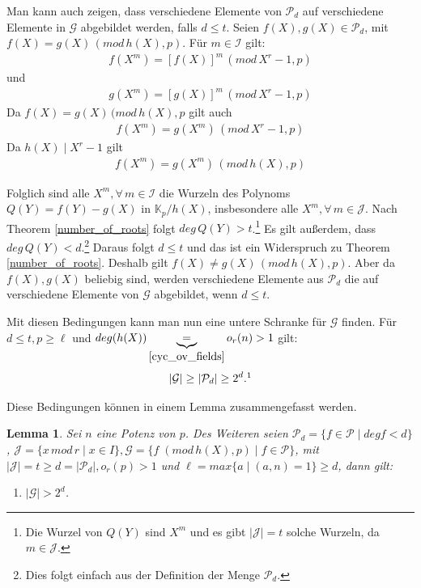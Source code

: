 \documentclass[12pt,oneside]{article}
\newtheorem{lemma}[theorem]{Lemma}
\theoremstyle{remark}
\theoremstyle{definition}
\begin{document}
\begin{flushleft}
Man kann auch zeigen, dass verschiedene Elemente von $\mathcal{P}_d$ auf verschiedene Elemente in $\mathcal{G}$ abgebildet werden, falls $d \leq t$. Seien $f(X),g(X) \in \mathcal{P}_{d}$, mit $f(X) = g(X) \, (mod \, h(X),p)$. Für $m \in \mathcal{I}$ gilt:
\begin{align*}
    f(X^m) = [f(X)]^{m} \, (mod \,X^{r} - 1,p)
\end{align*}
und
\begin{align*}
    g(X^m) = [g(X)]^{m} \, (mod \, X^{r} - 1,p)
\end{align*}
Da $f(X) = g(X) \, (mod \, h(X),p$ gilt auch
\begin{align*}
    f(X^m) = g(X^m) \, (mod \, X^{r} - 1,p)
\end{align*}
Da $h(X) \mid X^{r} - 1$ gilt
\begin{align*}
    f(X^m) = g(X^m) \, (mod \, h(X),p)
\end{align*}

Folglich sind alle $X^m, \forall \, m \in \mathcal{I}$ die Wurzeln des Polynoms $Q(Y) = f(Y) - g(X)$ in $\mathbb{K}_p/h(X)$, insbesondere alle $X^m, \forall \, m \in \mathcal{J}$. Nach Theorem \ref{number_of_roots} folgt $deg \, Q(Y) > t$.\footnote{Die Wurzel von $Q(Y)$ sind $X^m$ und es gibt $|\mathcal{J}| = t$ solche Wurzeln, da $m \in \mathcal{J}$.} Es gilt außerdem, dass $deg \, Q(Y) < d$.\footnote{Dies folgt einfach aus der Definition der Menge $\mathcal{P}_d$.} Daraus folgt $d \leq t$ und das ist ein Widerspruch zu Theorem \ref{number_of_roots}. Deshalb gilt $f(X) \neq g(X) \, (mod \, h(X),p)$. Aber da $f(X),g(X)$ beliebig sind, werden verschiedene Elemente aus $\mathcal{P}_d$ die auf verschiedene Elemente von $\mathcal{G}$ abgebildet, wenn $d \leq t$.

Mit diesen Bedingungen kann man nun eine untere Schranke für $\mathcal{G}$ finden. Für $d \leq t,p \geq \ell$ und $deg(h(X))\underbrace{=}_{\ref{cyc_ov_fields}} o_{r}(n) > 1$ gilt:
\begin{align*}
|\mathcal{G}| \geq |\mathcal{P}_{d}| \geq  2^d.\footnotemark
\end{align*}

Diese Bedingungen können in einem Lemma zusammengefasst werden.

\begin{lemma}\label{second-group-first-bound}
Sei $n$ eine Potenz von $p$. Des Weiteren seien $\mathcal{P}_{d} = \{ f \in \mathcal{P} \mid deg f < d \}$, $\mathcal{J} = \{ x \, mod \, r \mid x \in I\}, \mathcal{G} = \{f \; (mod \, h(X), p) \mid f \in \mathcal{P} \}$, mit $|\mathcal{J}| = t \geq d = |\mathcal{P}_{d}|, o_{r}(p) > 1$ und $\ell= max \{a \mid (a,n)= 1\} \geq d$, dann gilt:
\begin{enumerate}
\item $|\mathcal{G}| > 2^d$.\newline


\end{enumerate}
\end{lemma}
\end{flushleft}
\end{document}
